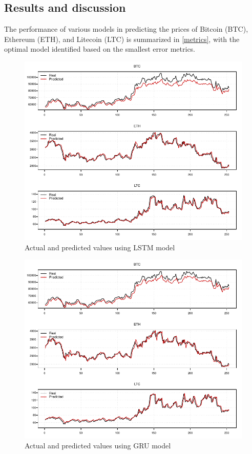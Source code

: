 \documentclass{dsfe}
\begin{document}
\subsection{Results and discussion}
The performance of various models in predicting the prices of Bitcoin (BTC), Ethereum (ETH), and Litecoin (LTC) is summarized in \autoref{metrics}, with the optimal model identified based on the smallest error metrics.
\begin{figure}[t]
\centering
\includegraphics[scale=1.25]{LSTM.pdf}
\caption{Actual and predicted values using LSTM model}\label{lstm_res}
\end{figure}

\begin{figure}[t]
\centering
\includegraphics[scale=1.25]{GRU_.pdf}
\caption{Actual and predicted values using GRU model}\label{gru_res}
\end{figure}
\end{document}
